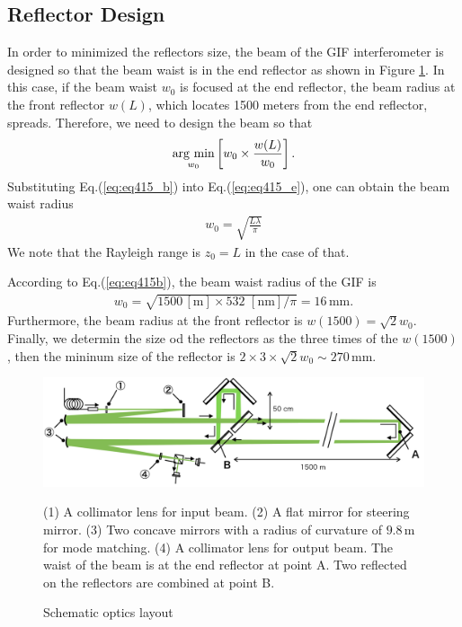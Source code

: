 \subsection{Reflector Design}
In order to minimized the reflectors size, the beam of the GIF interferometer is designed so that the beam waist is in the end reflector as shown in Figure \ref{img:img416}. In this case, if the beam waist $w_0$ is focused at the end reflector, the beam radius at the front reflector $w(L)$, which locates 1500 meters from the end reflector, spreads. Therefore, we need to design the beam so that
\begin{eqnarray}
  \mathop{\rm arg~min}\limits_{w_0} \left[w_0\times\frac{w(L)}{w_0}\right]. \label{eq:eq415_e}
\end{eqnarray}
Substituting Eq.(\ref{eq:eq415_b}) into Eq.(\ref{eq:eq415_e}), one can obtain the beam waist radius
\begin{eqnarray}
  w_0 = \sqrt{\frac{{L\lambda}}{\pi}} \label{eq:eq415b}
\end{eqnarray}
We note that the Rayleigh range is $z_0 = L$ in the case of that.

According to Eq.(\ref{eq:eq415b}), the beam waist radius of the GIF is
\begin{eqnarray}
  w_0=\sqrt{{1500\,\mathrm{[m]}}\times 532\,\,\mathrm{[nm]}/\pi} = 16\,\mathrm{mm}.
\end{eqnarray}
Furthermore, the beam radius at the front reflector is $w(1500)=\sqrt{2}{w_0}$. Finally, we determin the size od the reflectors as the three times of the $w(1500)$, then the mininum size of the reflector is $2\times3\times\sqrt{2}w_0\sim270\,\mathrm{mm}$.

\begin{figure}[p]
  \begin{center}   
    \includegraphics[width=14cm]{./img_chap4/img416.png}
    \caption{Schematic optics layout}{(1) A collimator lens for input beam. (2) A flat mirror for steering mirror. (3) Two concave mirrors with a radius of curvature of $9.8\,\mathrm{m}$ for mode matching. (4) A collimator lens for output beam. The waist of the beam is at the end reflector at point A. Two reflected on the reflectors are combined at point B.}\label{img:img416}
  \end{center}
\end{figure}

